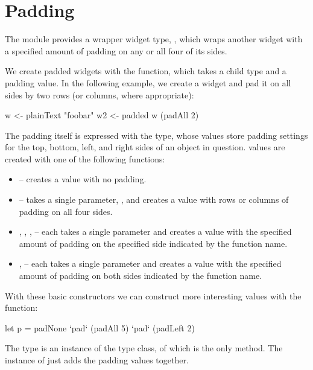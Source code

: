 \section{Padding}
\label{sec:padding}

The  module provides a wrapper widget type, ,
which wraps another widget with a specified amount of padding on any
or all four of its sides.

We create padded widgets with the  function, which takes a
child type  and a padding value.  In the following
example, we create a  widget and pad it on all sides
by two rows (or columns, where appropriate):

\begin{haskellcode}
 w <- plainText "foobar"
 w2 <- padded w (padAll 2)
\end{haskellcode}

The padding itself is expressed with the  type, whose
values store padding settings for the top, bottom, left, and right
sides of an object in question.   values are created with
one of the following functions:

\begin{itemize}
\item {} -- creates a  value with no padding.
\item {} -- takes a single parameter, , and creates a
   value with  rows or columns of padding on all
  four sides.
\item {}, , ,  -- each
  takes a single parameter and creates a  value with the
  specified amount of padding on the specified side indicated by the
  function name.
\item {},  -- each takes a single
  parameter and creates a  value with the specified
  amount of padding on both sides indicated by the function name.
\end{itemize}

With these basic  constructors we can construct more
interesting  values with the  function:

\begin{haskellcode}
 let p = padNone `pad` (padAll 5) `pad` (padLeft 2)
\end{haskellcode}

The  type is an instance of the  type class,
of which  is the only method.  The  instance of
 just adds the padding values together.

